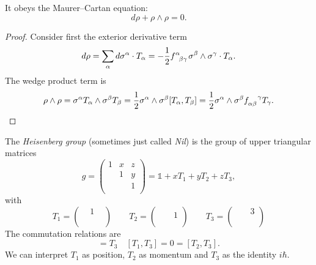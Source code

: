 \begin{claim}
  It obeys the Maurer--Cartan equation:
  \begin{equation}
    d\rho + \rho \wedge \rho = 0.
  \end{equation}
\end{claim}
\begin{proof}
  Consider first the exterior derivative term
  \begin{equation}
    d \rho = \sum_\alpha d\sigma^{\alpha} \cdot T_{\alpha} = -\frac{1}{2} f\indices{^{\alpha}_{\beta\gamma}} \sigma^{\beta} \wedge \sigma^{\gamma} \cdot T_{\alpha}.
  \end{equation}
  The wedge product term is
  \begin{equation}
    \rho \wedge \rho = \sigma^{\alpha} T_{\alpha} \wedge \sigma^{\beta} T_{\beta} = \frac{1}{2} \sigma^{\alpha} \wedge \sigma^{\beta} [T_{\alpha}, T_{\beta}]
    = \frac{1}{2} \sigma^{\alpha} \wedge \sigma^{\beta} f\indices{_{\alpha\beta}^{\gamma}} T_{\gamma}.
  \end{equation}
\end{proof}
\begin{example}
  The \emph{Heisenberg group} (sometimes just called \emph{Nil}) is the group of upper triangular matrices
  \begin{equation}
    g = 
    \begin{pmatrix}
     1 & x & z \\
      & 1 & y \\
      &  & 1 \\
    \end{pmatrix}
    = \mathbb{1} + x T_1 + yT_2 + z T_3,
  \end{equation}
  with
  \begin{equation}
    T_1 = 
    \begin{pmatrix}
      & 1 &  \\
      &  &  \\
      &  &  \\
    \end{pmatrix}
    \qquad
    T_2 = 
    \begin{pmatrix}
      &  &  \\
      &  & 1 \\
      &  &  \\
    \end{pmatrix}
    \qquad
    T_3 = 
    \begin{pmatrix}
      &  & 3 \\
      &  &  \\
      &  &  \\
    \end{pmatrix}
  \end{equation}
  The commutation relations are
  \begin{equation}
    [T_1, T_2] = T_3 \quad [T_1, T_3] = 0 = [T_2, T_3].
  \end{equation}
  We can interpret $T_1$ as position, $T_2$ as momentum and $T_3$ as the identity $i \hbar$.
\end{example}
